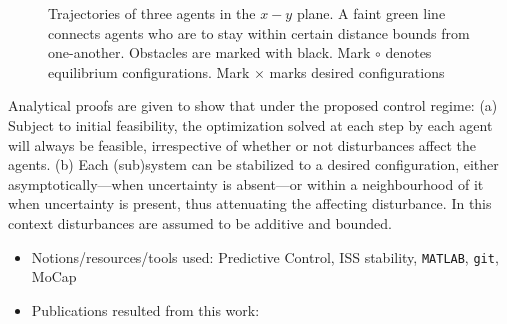 \begin{figure}[H]\centering
  \scalebox{0.8}{}
  \caption{\small Trajectories of three agents in the $x-y$ plane. A faint
           green line connects agents who are to stay within certain distance
           bounds from one-another. Obstacles are marked with black. Mark
           $\circ$ denotes equilibrium configurations. Mark $\times$ marks
           desired configurations}
  \label{fig:d_OFF_res_trajectory_3_2}
\end{figure}

Analytical proofs are given to show that under the proposed control regime: (a)
Subject to initial feasibility, the optimization solved at each step by each
agent will always be feasible, irrespective of whether or not disturbances
affect the agents. (b) Each (sub)system can be stabilized to a desired
configuration, either asymptotically---when uncertainty is absent---or within a
neighbourhood of it when uncertainty is present, thus attenuating the
affecting disturbance. In this context disturbances are assumed to be additive
and bounded.

\begin{itemize}
  \item Notions/resources/tools used: Predictive Control, ISS stability, \texttt{MATLAB}, \texttt{git}, MoCap
  \item Publications resulted from this work: \cite{Filotheou2018,Filotheou2020}
\end{itemize}
